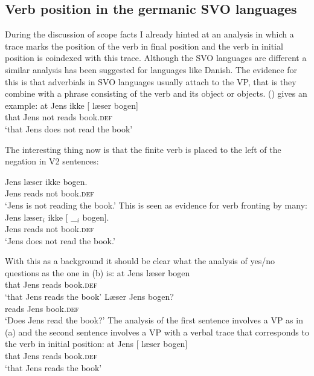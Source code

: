 \subsection{Verb position in the germanic SVO languages}
\label{sec-danish-verb-movement}

During the discussion of scope facts I already hinted at an analysis in which a trace marks the
position of the verb in final position and the verb in initial position is coindexed with this
trace. Although the SVO languages are different a similar analysis has been suggested for languages
like Danish. The evidence for this is that adverbials in SVO languages usually attach to the VP,
that is they combine with a phrase consisting of the verb and its object or objects. () gives
an example:
\ea
\gll  at   Jens ikke [ læser bogen]\\
      that Jens not      {}        reads          book.\textsc{def}\\
\glt `that Jens does not read the book'
\z

The interesting thing now is that the finite verb is placed to the left of the negation in V2 sentences:

\ea
\gll  Jens læser ikke bogen.\\
       Jens reads   not  book.\textsc{def}\\
\glt `Jens is not reading the book.'
\z
This is seen as evidence for verb fronting by many:
\ea
\gll  Jens læser$_i$ ikke [ \_$_i$ bogen].\\
      Jens reads      not  {} {}    book.\textsc{def}\\
\glt `Jens does not read the book.'
\z
\nocite{KS2002a-u}

With this as a background it should be clear what the analysis of yes/no questions as the one in (b) is:
\eal
\ex
\gll at Jens læser bogen\\
     that Jens reads book.\textsc{def}\\
\glt `that Jens reads the book'
\ex\label{ex-laeser-jens-bogen}
\gll Læser Jens bogen?\\
     reads Jens book.\textsc{def}\\
\glt `Does Jens read the book?'
\zl
The analysis of the first sentence involves a VP as in (a) and the second sentence involves a
VP with a verbal trace that corresponds to the verb in initial position:
\eal
\ex
\gll at Jens [ læser bogen]\\
     that Jens {} reads book.\textsc{def}\\
\glt `that Jens reads the book'

